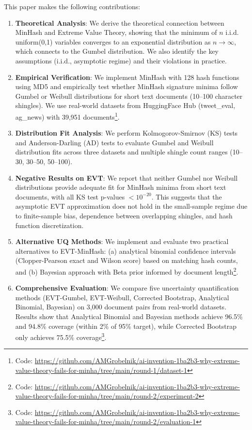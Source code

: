 \documentclass[11pt,letterpaper]{article}
\begin{document}
This paper makes the following contributions:

\begin{enumerate}
    \item \textbf{Theoretical Analysis}: We derive the theoretical connection between MinHash and Extreme Value Theory, showing that the minimum of $n$ i.i.d. uniform(0,1) variables converges to an exponential distribution as $n \to \infty$, which connects to the Gumbel distribution. We also identify the key assumptions (i.i.d., asymptotic regime) and their violations in practice.
    
    \item \textbf{Empirical Verification}: We implement MinHash with 128 hash functions using MD5 and empirically test whether MinHash signature minima follow Gumbel or Weibull distributions for short text documents (10--100 character shingles). We use real-world datasets from HuggingFace Hub (tweet\_eval, ag\_news) with 39,951 documents\footnote{Code: \url{https://github.com/AMGrobelnik/ai-invention-1ba2b3-why-extreme-value-theory-fails-for-minha/tree/main/round-1/dataset-1}}.
    
    \item \textbf{Distribution Fit Analysis}: We perform Kolmogorov-Smirnov (KS) tests and Anderson-Darling (AD) tests to evaluate Gumbel and Weibull distribution fits across three datasets and multiple shingle count ranges (10--30, 30--50, 50--100).
    
    \item \textbf{Negative Results on EVT}: We report that neither Gumbel nor Weibull distributions provide adequate fit for MinHash minima from short text documents, with all KS test p-values $< 10^{-20}$. This suggests that the asymptotic EVT approximation does not hold in the small-sample regime due to finite-sample bias, dependence between overlapping shingles, and hash function discretization.
    
    \item \textbf{Alternative UQ Methods}: We implement and evaluate two practical alternatives to EVT-MinHash: (a) analytical binomial confidence intervals (Clopper-Pearson exact and Wilson score) based on matching hash counts, and (b) Bayesian approach with Beta prior informed by document length\footnote{Code: \url{https://github.com/AMGrobelnik/ai-invention-1ba2b3-why-extreme-value-theory-fails-for-minha/tree/main/round-2/experiment-2}}.
    
    \item \textbf{Comprehensive Evaluation}: We compare five uncertainty quantification methods (EVT-Gumbel, EVT-Weibull, Corrected Bootstrap, Analytical Binomial, Bayesian) on 3,000 document pairs from real-world datasets. Results show that Analytical Binomial and Bayesian methods achieve 96.5\% and 94.8\% coverage (within 2\% of 95\% target), while Corrected Bootstrap only achieves 75.5\% coverage\footnote{Code: \url{https://github.com/AMGrobelnik/ai-invention-1ba2b3-why-extreme-value-theory-fails-for-minha/tree/main/round-2/evaluation-1}}.
    

\end{enumerate}
\end{document}
